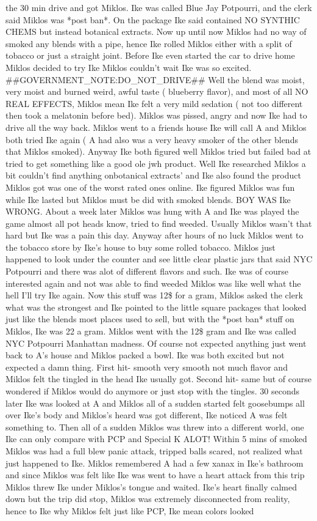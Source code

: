 \documentclass[12pt]{book}
\begin{document}
the 30 min drive and got Miklos. Ike was called Blue Jay Potpourri, and the clerk said Miklos was *post ban*. On the package Ike said contained NO SYNTHIC CHEMS but instead botanical extracts. Now up until now Miklos had no way of smoked any blends with a pipe, hence Ike rolled Miklos either with a split of tobacco or just a straight joint. Before Ike even started the car to drive home Miklos decided to try Ike Miklos couldn't wait Ike was so excited. \#\#GOVERNMENT\_NOTE:DO\_NOT\_DRIVE\#\# Well the blend was moist, very moist and burned weird, awful taste ( blueberry flavor), and most of all NO REAL EFFECTS, Miklos mean Ike felt a very mild sedation ( not too different then took a melatonin before bed). Miklos was pissed, angry and now Ike had to drive all the way back. Miklos went to a friends house Ike will call A and Miklos both tried Ike again (  A had also was a very heavy smoker of the other blends that Miklos smoked). Anyway Ike both figured well Miklos tried but failed bad at tried to get something like a good ole jwh product. Well Ike researched Miklos a bit couldn't find anything onbotanical extracts' and Ike also found the product Miklos got was one of the worst rated ones online. Ike figured Miklos was fun while Ike lasted but Miklos must be did with smoked blends. BOY WAS Ike WRONG. About a week later Miklos was hung with A and Ike was played the game almost all pot heads know, tried to find weeded. Usually Miklos wasn't that hard but Ike was a pain this day. Anyway after hours of no luck Miklos went to the tobacco store by Ike's house to buy some rolled tobacco. Miklos just happened to look under the counter and see little clear plastic jars that said NYC Potpourri and there was alot of different flavors and such. Ike was of course interested again and not was able to find weeded Miklos was like well what the hell I'll try Ike again. Now this stuff was 12\$ for a gram, Miklos asked the clerk what was the strongest and Ike pointed to the little square packages that looked just like the blends most places used to sell, but with the *post ban* stuff on Miklos, Ike was 22 a gram. Miklos went with the 12\$ gram and Ike was called NYC Potpourri Manhattan madness. Of course not expected anything just went back to A's house and Miklos packed a bowl. Ike was both excited but not expected a damn thing. First hit- smooth very smooth not much flavor and Miklos felt the tingled in the head Ike usually got. Second hit- same but of course wondered if Miklos would do anymore or just stop with the tingles. 30 seconds later Ike was looked at A and Miklos all of a sudden started felt goosebumps all over Ike's body and Miklos's heard was got different, Ike noticed A was felt something to. Then all of a sudden Miklos was threw into a different world, one Ike can only compare with PCP and Special K ALOT! Within 5 mins of smoked Miklos was had a full blew panic attack, tripped balls scared, not realized what just happened to Ike. Miklos remembered A had a few xanax in Ike's bathroom and since Miklos was felt like Ike was went to have a heart attack from this trip Miklos threw Ike under Miklos's tongue and waited. Ike's heart finally calmed down but the trip did stop, Miklos was extremely disconnected from reality, hence to Ike why Miklos felt just like PCP, Ike mean colors looked 
\end{document}
